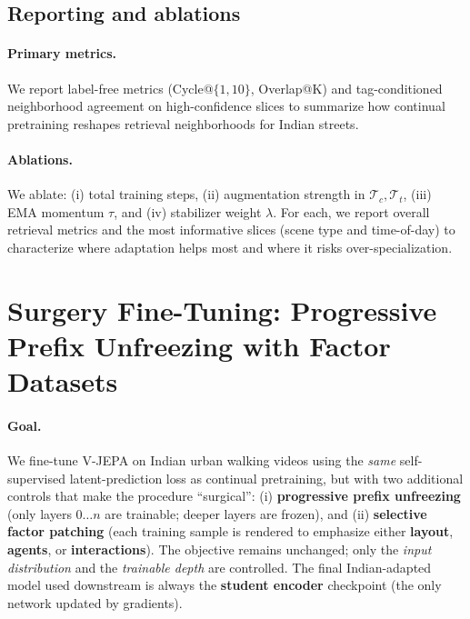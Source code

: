 \subsection{Reporting and ablations}\label{sec:ctp_reporting}
\paragraph{Primary metrics.} We report label-free metrics (Cycle@$\{1,10\}$, Overlap@K) and tag-conditioned neighborhood agreement on high-confidence slices to summarize how continual pretraining reshapes retrieval neighborhoods for Indian streets.
\paragraph{Ablations.} We ablate: (i) total training steps, (ii) augmentation strength in $\mathcal{T}_c,\mathcal{T}_t$, (iii) EMA momentum $\tau$, and (iv) stabilizer weight $\lambda$. For each, we report overall retrieval metrics and the most informative slices (scene type and time-of-day) to characterize where adaptation helps most and where it risks over-specialization.

































\section{Surgery Fine-Tuning: Progressive Prefix Unfreezing with Factor Datasets}\label{sec:surgery_finetuning}
\paragraph{Goal.} We fine-tune V-JEPA on Indian urban walking videos using the \emph{same} self-supervised latent-prediction loss as continual pretraining, but with two additional controls that make the procedure ``surgical'': (i) \textbf{progressive prefix unfreezing} (only layers $0\ldots n$ are trainable; deeper layers are frozen), and (ii) \textbf{selective factor patching} (each training sample is rendered to emphasize either \textbf{layout}, \textbf{agents}, or \textbf{interactions}). The objective remains unchanged; only the \emph{input distribution} and the \emph{trainable depth} are controlled. The final Indian-adapted model used downstream is always the \textbf{student encoder} checkpoint (the only network updated by gradients).

